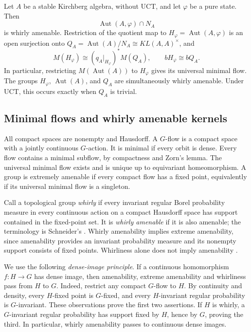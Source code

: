 \begin{theorem}\label{thm:st-stable-stabilizer}
 Let $A$ be a stable Kirchberg algebra,
without UCT, and let $\varphi$ be a pure state. Then 
\begin{equation*}
\operatorname{Aut}(A,\varphi)\cap N_A 
\end{equation*}
is whirly amenable. Restriction of the quotient map to $H_\varphi=\operatorname{Aut} (A,\varphi)$ is an open surjection onto $Q_A=\operatorname{Aut}(A)/N_A\cong KL(A,A)^\times$, and 
\begin{equation*}
M(H_\varphi)\cong(q_A|_{H_\varphi})^*M(Q_A),\qquad  bH_\varphi\cong bQ_A. 
\end{equation*}
In particular, restricting $M(\operatorname{Aut}(A))$ to $H_\varphi$ gives its universal
minimal flow.
The groups $H_\varphi$, $\operatorname{Aut}(A)$, and $Q_A$ are simultaneously whirly
amenable. Under UCT, this occurs exactly when $Q_A$ is trivial.
\end{theorem}

\subsection{Minimal flows and whirly amenable kernels}

\label{sec:st-dynamics} All compact spaces are nonempty and Hausdorff. A $G$-flow is a compact space with a jointly continuous $G$-action. It is minimal
if every orbit is dense. Every flow contains a minimal subflow, by
compactness and Zorn's lemma. The universal minimal flow exists and is
unique up to equivariant homeomorphism. A group is extremely amenable if
every compact flow has a fixed point, equivalently if its universal minimal
flow is a singleton.

Call a topological group \emph{whirly} if every invariant regular Borel
probability measure in every continuous action on a compact Hausdorff space
has support contained in the fixed-point set. It is \emph{whirly amenable}
if it is also amenable; the terminology is Schneider's
\cite[Corollary~5.7]{Schneider2019}. Whirly amenability implies extreme amenability,
since amenability provides an invariant probability measure and its
nonempty support consists of fixed points. Whirliness alone does not imply
amenability \cite{HollSchneider2026}.

We use the following \emph{dense-image principle}. If a continuous
homomorphism \(f:H\to G\) has dense image, then amenability, extreme
amenability and whirliness pass from \(H\) to \(G\). Indeed, restrict
any compact \(G\)-flow to \(H\). By continuity and density, every
\(H\)-fixed point is \(G\)-fixed, and every \(H\)-invariant regular
probability is \(G\)-invariant. These observations prove the first two
assertions. If \(H\) is whirly, a \(G\)-invariant regular probability
has support fixed by \(H\), hence by \(G\), proving the third.
In particular, whirly amenability passes to continuous dense images.

